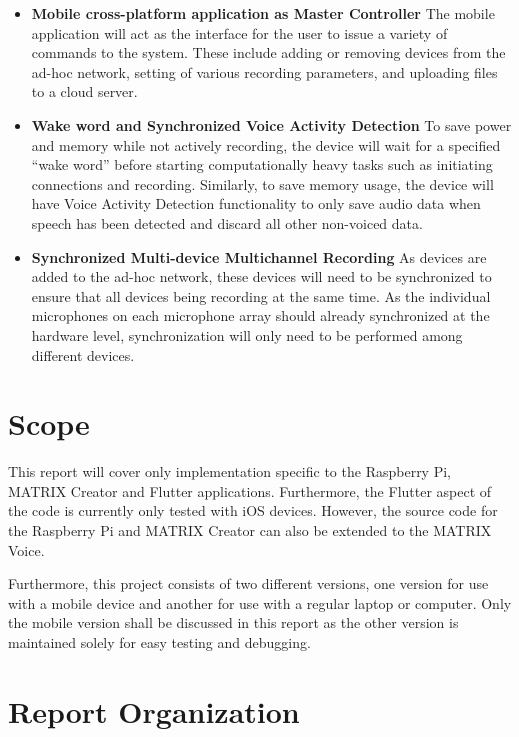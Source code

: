 \documentclass[hidelinks,12pt]{report} %
\begin{document}
	\begin{itemize}
	\item{\textbf{Mobile cross-platform application as Master Controller}}\linebreak
	The mobile application will act as the interface for the user to issue a variety of commands to the system. These include adding or removing devices from the ad-hoc network, setting of various recording parameters, and uploading files to a cloud server.

	\item{\textbf{Wake word and Synchronized Voice Activity Detection}}\linebreak
	To save power and memory while not actively recording, the device will wait for a specified “wake word” before starting computationally heavy tasks such as initiating connections and recording. Similarly, to save memory usage, the device will have Voice Activity Detection functionality to only save audio data when speech 		has been detected and discard all other non-voiced data. 

	\item{\textbf{Synchronized Multi-device Multichannel Recording}}\linebreak
	As devices are added to the ad-hoc network, these devices will need to be synchronized to ensure that all devices being recording at the same time. As the individual microphones on each microphone array should already synchronized at the hardware level, synchronization will only need to be performed among different devices. 
	\end{itemize}
\section{Scope}

This report will cover only implementation specific to the Raspberry Pi, MATRIX Creator and Flutter applications. Furthermore, the Flutter aspect of the code is currently only tested with iOS devices. However, the source code for the Raspberry Pi and MATRIX Creator can also be extended to the MATRIX Voice. 

Furthermore, this project consists of two different versions, one version for use with a mobile device and another for use with a regular laptop or computer. Only the mobile version shall be discussed in this report as the other version is maintained solely for easy testing and debugging. 

\section{Report Organization}
\end{document}

